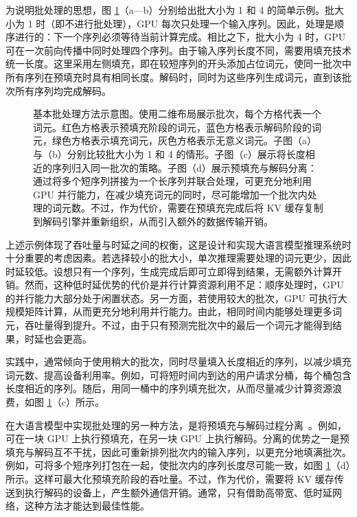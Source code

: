为说明批处理的思想，图 \ref{fig:basic-llm-batching-methods}（a—b）分别给出批大小为 1 和 4 的简单示例。批大小为 1 时（即不进行批处理），GPU 每次只处理一个输入序列。因此，处理是顺序进行的：下一个序列必须等待当前计算完成。相比之下，批大小为 4 时，GPU 可在一次前向传播中同时处理四个序列。由于输入序列长度不同，需要用填充技术统一长度。这里采用左侧填充，即在较短序列的开头添加占位词元，使同一批次中所有序列在预填充时具有相同长度。解码时，同时为这些序列生成词元，直到该批次所有序列均完成解码。

\begin{figure}[!t]
\centering

\vspace{-0.5cm} \caption{基本批处理方法示意图。使用二维布局展示批次，每个方格代表一个词元。红色方格表示预填充阶段的词元，蓝色方格表示解码阶段的词元，绿色方格表示填充词元，灰色方格表示无意义词元。子图（a）与（b）分别比较批大小为 1 和 4 的情形。子图（c）展示将长度相近的序列归入同一批次的策略。子图（d）展示预填充与解码分离：通过将多个短序列拼接为一个长序列并联合处理，可更充分地利用 GPU 并行能力，在减少填充词元的同时，尽可能增加一个批次内处理的词元数。不过，作为代价，需要在预填充完成后将 KV 缓存复制到解码引擎并重新组织，从而引入额外的数据传输开销。}
\label{fig:basic-llm-batching-methods}
\end{figure}

上述示例体现了吞吐量与时延之间的权衡，这是设计和实现大语言模型推理系统时十分重要的考虑因素。若选择较小的批大小，单次推理需要处理的词元更少，因此时延较低。设想只有一个序列，生成完成后即可立即得到结果，无需额外计算开销。然而，这种低时延优势的代价是并行计算资源利用不足：顺序处理时，GPU 的并行能力大部分处于闲置状态。另一方面，若使用较大的批次，GPU 可执行大规模矩阵计算，从而更充分地利用并行能力。由此，相同时间内能够处理更多词元，吞吐量得到提升。不过，由于只有预测完批次中的最后一个词元才能得到结果，时延也会更高。

实践中，通常倾向于使用稍大的批次，同时尽量填入长度相近的序列，以减少填充词元数、提高设备利用率。例如，可将短时间内到达的用户请求分桶，每个桶包含长度相近的序列。随后，用同一桶中的序列填充批次，从而尽量减少计算资源浪费，如图 \ref{fig:basic-llm-batching-methods}（c）所示。

在大语言模型中实现批处理的另一种方法，是将预填充与解码过程分离~\cite{wu-etal:2023fast,patel-etal:2024splitwise,zhong-etal:2024distserve}。例如，可在一块 GPU 上执行预填充，在另一块 GPU 上执行解码。分离的优势之一是预填充与解码互不干扰，因此可重新排列批次内的输入序列，以更充分地填满批次。例如，可将多个短序列打包在一起，使批次内的序列长度尽可能一致，如图 \ref{fig:basic-llm-batching-methods}（d）所示。这样可最大化预填充阶段的吞吐量。不过，作为代价，需要将 KV 缓存传送到执行解码的设备上，产生额外通信开销。通常，只有借助高带宽、低时延网络，这种方法才能达到最佳性能。

